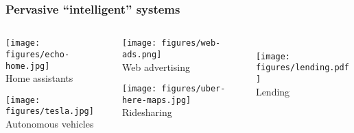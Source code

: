 \begin{frame}
  \frametitle{Pervasive ``intelligent'' systems}
  \begin{columns}
    \begin{column}{0.3\textwidth}
      \centering
      \texttt{[image: figures/echo-home.jpg]}
      \\
      Home assistants

      \vspace{\fill}

      \bigskip

      \texttt{[image: figures/tesla.jpg]}
      \\
      Autonomous vehicles
    \end{column}
    \begin{column}{0.3\textwidth}
      \centering 
      \texttt{[image: figures/web-ads.png]}
      \\
      Web advertising

      \vspace{\fill}

      \bigskip

      \texttt{[image: figures/uber-here-maps.jpg]}
      \\
      Ridesharing
    \end{column}
    \begin{column}{0.3\textwidth}
      \centering 
      \\
      \texttt{[image: figures/lending.pdf]}
      \\
      Lending

      \vspace{\fill}

      \bigskip


\end{column}
\end{columns}
\end{frame}
